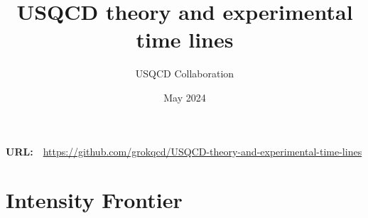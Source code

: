 \documentclass[12pt,hyperpdf]{article}
\title{USQCD theory and experimental time lines}
\author{USQCD Collaboration}
\date{May 2024}
\begin{document}


\maketitle

\begin{center}
{\bf URL:}\ \ \url{https://github.com/grokqcd/USQCD-theory-and-experimental-time-lines}
\end{center}



\setcounter{page}{1}

\tableofcontents

\clearpage
\setcounter{page}{1}

\section{Intensity Frontier}\label{sec:intensity}

\end{document}

